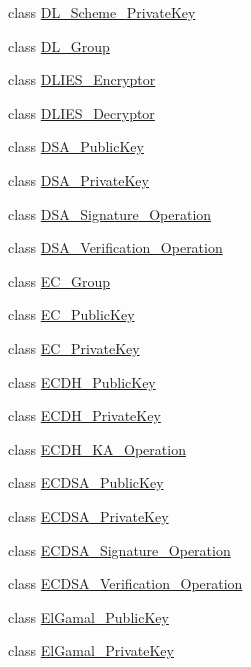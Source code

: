 \begin{DoxyCompactItemize}
class \hyperlink{classBotan_1_1DL__Scheme__PrivateKey}{D\-L\-\_\-\-Scheme\-\_\-\-Private\-Key}
\item 
class \hyperlink{classBotan_1_1DL__Group}{D\-L\-\_\-\-Group}
\item 
class \hyperlink{classBotan_1_1DLIES__Encryptor}{D\-L\-I\-E\-S\-\_\-\-Encryptor}
\item 
class \hyperlink{classBotan_1_1DLIES__Decryptor}{D\-L\-I\-E\-S\-\_\-\-Decryptor}
\item 
class \hyperlink{classBotan_1_1DSA__PublicKey}{D\-S\-A\-\_\-\-Public\-Key}
\item 
class \hyperlink{classBotan_1_1DSA__PrivateKey}{D\-S\-A\-\_\-\-Private\-Key}
\item 
class \hyperlink{classBotan_1_1DSA__Signature__Operation}{D\-S\-A\-\_\-\-Signature\-\_\-\-Operation}
\item 
class \hyperlink{classBotan_1_1DSA__Verification__Operation}{D\-S\-A\-\_\-\-Verification\-\_\-\-Operation}
\item 
class \hyperlink{classBotan_1_1EC__Group}{E\-C\-\_\-\-Group}
\item 
class \hyperlink{classBotan_1_1EC__PublicKey}{E\-C\-\_\-\-Public\-Key}
\item 
class \hyperlink{classBotan_1_1EC__PrivateKey}{E\-C\-\_\-\-Private\-Key}
\item 
class \hyperlink{classBotan_1_1ECDH__PublicKey}{E\-C\-D\-H\-\_\-\-Public\-Key}
\item 
class \hyperlink{classBotan_1_1ECDH__PrivateKey}{E\-C\-D\-H\-\_\-\-Private\-Key}
\item 
class \hyperlink{classBotan_1_1ECDH__KA__Operation}{E\-C\-D\-H\-\_\-\-K\-A\-\_\-\-Operation}
\item 
class \hyperlink{classBotan_1_1ECDSA__PublicKey}{E\-C\-D\-S\-A\-\_\-\-Public\-Key}
\item 
class \hyperlink{classBotan_1_1ECDSA__PrivateKey}{E\-C\-D\-S\-A\-\_\-\-Private\-Key}
\item 
class \hyperlink{classBotan_1_1ECDSA__Signature__Operation}{E\-C\-D\-S\-A\-\_\-\-Signature\-\_\-\-Operation}
\item 
class \hyperlink{classBotan_1_1ECDSA__Verification__Operation}{E\-C\-D\-S\-A\-\_\-\-Verification\-\_\-\-Operation}
\item 
class \hyperlink{classBotan_1_1ElGamal__PublicKey}{El\-Gamal\-\_\-\-Public\-Key}
\item 
class \hyperlink{classBotan_1_1ElGamal__PrivateKey}{El\-Gamal\-\_\-\-Private\-Key}
\item 

\end{DoxyCompactItemize}
